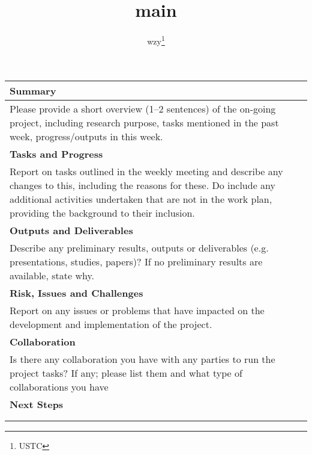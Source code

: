 \documentclass[a4paper]{article}
\title{main}
\author{wzy\thanks{USTC}}
\newcommand{\Name}[1]{\textbf{\large #1}}
\begin{document}
\mbox{}

\begin{tabular}{|p{2.2in}|p{4.64in}|}
  \firsthline
  \Name{Name:} & \\
  \hline
  \Name{Project Name:} & \\
  \hline
  \Name{Reporting Period:} & \\
  \hline
  \multicolumn{2}{|p{\linewidth}|}{\Name{Summary}}\\
  \hline
  \multicolumn{2}{|p{\linewidth}|}{%
    Please provide a short overview (1--2 sentences) of the on-going project,
    including research purpose, tasks mentioned in the past week,
    progress/outputs in this week.
  }\\
  \hline
  \multicolumn{2}{|p{\linewidth}|}{\Name{Tasks and Progress}}\\
  \hline
  \multicolumn{2}{|p{\linewidth}|}{%
    Report on tasks outlined in the weekly meeting and describe any changes
    to this, including the reasons for these. Do include any additional
    activities undertaken that are not in the work plan, providing the
    background to their inclusion.
  }\\
  \hline
  \multicolumn{2}{|p{\linewidth}|}{\Name{Outputs and Deliverables}}\\
  \hline
  \multicolumn{2}{|p{\linewidth}|}{%
    Describe any preliminary results, outputs or deliverables (e.g.
    presentations, studies, papers)? If no preliminary results are available,
    state why.
  }\\
  \hline
  \multicolumn{2}{|p{\linewidth}|}{\Name{Risk, Issues and Challenges}}\\
  \hline
  \multicolumn{2}{|p{\linewidth}|}{%
    Report on any issues or problems that have impacted on the development
    and implementation of the project.
  }\\
  \hline
  \multicolumn{2}{|p{\linewidth}|}{\Name{Collaboration}}\\
  \hline
  \multicolumn{2}{|p{\linewidth}|}{%
    Is there any collaboration you have with any parties to run the project
    tasks? If any; please list them and what type of collaborations you have
  }\\
  \hline
  \multicolumn{2}{|p{\linewidth}|}{\Name{Next Steps}}\\
  \hline
  \multicolumn{2}{|p{\linewidth}|}{%
  }\\
  \lasthline
\end{tabular}
\end{document}
